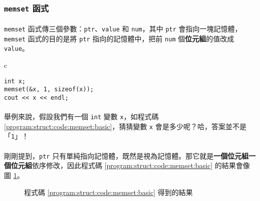 \documentclass[12pt,a4paper,oneside]{report}
\begin{document}
\begin{CJK}{UTF8}{bkai}
\subsubsection{\lstinline!memset! 函式}

\paragraph{}\lstinline!memset! 函式傳三個參數：\lstinline!ptr!、\lstinline!value! 和 \lstinline!num!，其中 \lstinline!ptr! 會指向一塊記憶體，\lstinline!memset! 函式的目的是將 \lstinline!ptr! 指向的記憶體中，把前 \lstinline!num! 個{\color{blue}\textbf{位元組}}的值改成 \lstinline!value!。

\begin{code}[h!]
\centering
\begin{tabular}{c}
\begin{lstlisting}
int x;
memset(&x, 1, sizeof(x));
cout << x << endl;
\end{lstlisting}
\end{tabular}
\caption{\lstinline!memset! 的基本用法}
\label{program:struct:code:memset:basic}
\end{code}

\paragraph{}舉例來說，假設我們有一個 \lstinline!int! 變數 \lstinline!x!，如程式碼 \ref{program:struct:code:memset:basic}，猜猜變數 \lstinline!x! 會是多少呢？哈，答案並不是「\lstinline!1!」！
\paragraph{}剛剛提到，\lstinline!ptr! 只有單純指向記憶體，既然是視為記憶體。那它就是\textbf{一個位元組一個位元組}依序修改，因此程式碼 \ref{program:struct:code:memset:basic} 的結果會像圖 \ref{program:struct:fig:memset:basic}。

\begin{figure}[h!]
\centering
{}
\caption{程式碼 \ref{program:struct:code:memset:basic} 得到的結果}
\label{program:struct:fig:memset:basic}
\end{figure}


\end{CJK}
\end{document}
